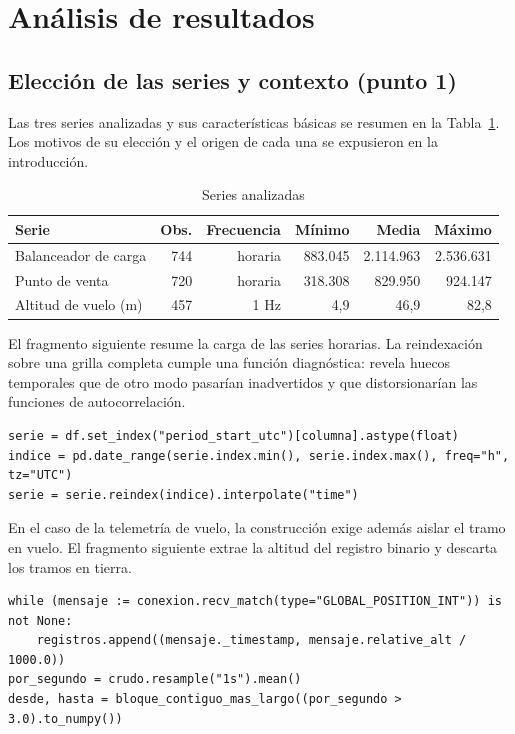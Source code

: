 \section{Análisis de resultados}

\subsection{Elección de las series y contexto (punto 1)}

Las tres series analizadas y sus características básicas se resumen en la
Tabla~\ref{tab:series}. Los motivos de su elección y el origen de cada una se expusieron en la introducción.

\begin{table}[htbp]
\centering
\caption{Series analizadas}
\label{tab:series}
\small
\begin{tabular}{lrrrrr}
\toprule
\textbf{Serie} & \textbf{Obs.} & \textbf{Frecuencia} & \textbf{Mínimo} & \textbf{Media} & \textbf{Máximo} \\
\midrule
Balanceador de carga & 744 & horaria & 883.045 & 2.114.963 & 2.536.631 \\
Punto de venta & 720 & horaria & 318.308 & 829.950 & 924.147 \\
Altitud de vuelo (m) & 457 & 1 Hz & 4,9 & 46,9 & 82,8 \\
\bottomrule
\end{tabular}
\end{table}

El fragmento siguiente resume la carga de las series horarias. La reindexación sobre una
grilla completa cumple una función diagnóstica: revela huecos temporales que de otro modo
pasarían inadvertidos y que distorsionarían las funciones de autocorrelación.

\begin{lstlisting}[caption={Carga y reindexación sobre grilla horaria completa}]
serie = df.set_index("period_start_utc")[columna].astype(float)
indice = pd.date_range(serie.index.min(), serie.index.max(), freq="h", tz="UTC")
serie = serie.reindex(indice).interpolate("time")
\end{lstlisting}

En el caso de la telemetría de vuelo, la construcción exige además aislar el tramo en vuelo.
El fragmento siguiente extrae la altitud del registro binario y descarta los tramos en tierra.

\begin{lstlisting}[caption={Extracción de la altitud y aislamiento del tramo en vuelo}]
while (mensaje := conexion.recv_match(type="GLOBAL_POSITION_INT")) is not None:
    registros.append((mensaje._timestamp, mensaje.relative_alt / 1000.0))
por_segundo = crudo.resample("1s").mean()
desde, hasta = bloque_contiguo_mas_largo((por_segundo > 3.0).to_numpy())
\end{lstlisting}

